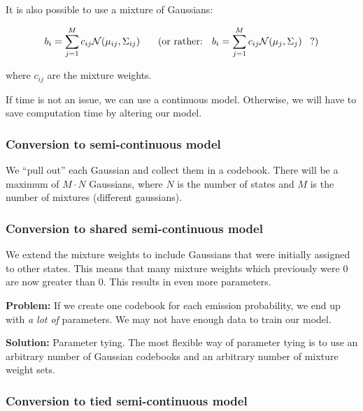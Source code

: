 It is also possible to use a mixture of Gaussians:

\[
    b_i = \sum\limits_{j=1}^M c_{ij} \mathcal{N}(\mu_{ij}, \Sigma_{ij}) \mbox{\hspace{15pt} (or rather: \hspace{5pt}} b_i = \sum\limits_{j=1}^M c_{ij} \mathcal{N}(\mu_{j}, \Sigma_{j}) \mbox{\hspace{5pt} ?)}
\]

where $c_{ij}$ are the mixture weights.

If time is not an issue, we can use a continuous model. Otherwise, we will have to save computation time by altering our model.

\subsubsection{Conversion to semi-continuous model}

We ``pull out'' each Gaussian and collect them in a codebook. There will be a maximum of $M \cdot N$ Gaussians, where $N$ is the number of states and $M$ is the number of mixtures (different gaussians).

\subsubsection{Conversion to shared semi-continuous model}

We extend the mixture weights to include Gaussians that were initially assigned to other states. This means that many mixture weights which previously were $0$ are now greater than $0$. This results in even more parameters.

\vspace{15pt}

\textbf{Problem:} If we create one codebook for each emission probability, we end up with \textit{a lot of} parameters. We may not have enough data to train our model.

\vspace{5pt}

\textbf{Solution:} Parameter tying. The most flexible way of parameter tying is to use an arbitrary number of Gaussian codebooks and an arbitrary number of mixture weight sets.

\subsubsection{Conversion to tied semi-continuous model}

